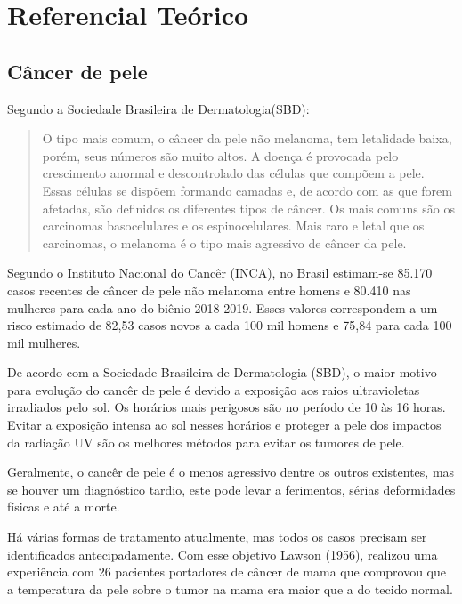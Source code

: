 \chapter*[Referencial Teórico]{Referencial Teórico}

\section{Câncer de pele}
    Segundo a Sociedade Brasileira de Dermatologia(SBD):
\begin{quotation}
	O tipo  mais comum, o câncer da pele não melanoma, tem letalidade baixa, porém, seus números são muito altos. A doença é provocada pelo crescimento anormal e descontrolado das células que compõem a pele. Essas células se dispõem formando camadas e, de acordo com as que forem afetadas, são definidos os diferentes tipos de câncer. Os mais comuns são os carcinomas basocelulares e os espinocelulares. Mais raro e letal que os carcinomas, o melanoma é o tipo mais agressivo de câncer da pele.\cite{INMETRO}
\end{quotation}
               
    Segundo o Instituto Nacional do Cancêr (INCA), no Brasil estimam-se 85.170 casos recentes de câncer de pele não melanoma entre homens e 80.410 nas mulheres para cada ano do biênio 2018-2019. Esses valores correspondem a um risco estimado de 82,53 casos novos a cada 100 mil homens e 75,84 para cada 100 mil mulheres. %
              
    De acordo com a Sociedade Brasileira de Dermatologia (SBD), o maior motivo para evolução do cancêr de pele é devido a exposição aos raios ultravioletas irradiados pelo sol. Os horários mais perigosos são no período de 10 às 16 horas. Evitar a exposição intensa ao sol nesses horários e proteger a pele dos impactos da radiação UV são os melhores métodos para evitar os tumores de pele.%

 Geralmente, o cancêr de pele é o menos agressivo dentre os outros existentes, mas se houver um diagnóstico tardio, este pode levar a ferimentos, sérias deformidades físicas e até a morte.


 Há várias formas de tratamento atualmente, mas todos os casos precisam ser identificados antecipadamente. Com esse objetivo Lawson (1956), realizou uma experiência com 26 pacientes portadores de câncer de mama que comprovou que a temperatura da pele sobre o tumor na mama era maior que a do tecido normal.%

